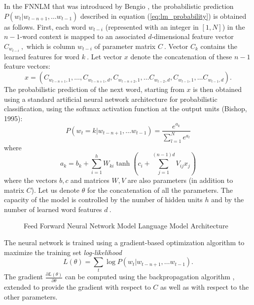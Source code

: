In the \ac{FNNLM} that was introduced by Bengio
\cite{Bengio:2003:NPL:944919.944966},  the probabilistic prediction $P(w_t | w_{t-n+1}, \ldots w_{t-1})$ described
in equation (\ref{eq:lm_probability}) is obtained as follows. First, each word $w_{t-i}$ (represented
with an integer in $[1,N]$) in the  $n-1$-word context is mapped
to an associated $d$-dimensional feature vector $C_{w_{t-i}}\ ,$ which is
column $w_{t-i}$ of parameter matrix $C\ .$ Vector $C_k$
contains the learned features for word $k\ .$
Let vector $x$ denote the concatenation of these $n-1$
feature vectors:
\begin{equation}
  x = (C_{w_{t-n+1},1}, \ldots, C_{w_{t-n+1},d}, C_{w_{t-n+2},1}, \ldots C_{w_{t-2},d}, C_{w_{t-1},1}, \ldots C_{w_{t-1},d}).
\end{equation}
The probabilistic prediction of the next word, starting from $x$
is then obtained using a standard artificial neural network architecture
for probabilistic classification, using the softmax activation function at the output units (Bishop, 1995):
\begin{equation}
 P(w_t=k | w_{t-n+1}, \ldots w_{t-1}) = \frac{e^{a_k}}{\sum_{l=1}^N e^{a_l}}
\end{equation}
where
\begin{equation}
 a_k = b_k + \sum_{i=1}^h W_{ki} \tanh(c_i + \sum_{j=1}^{(n-1)d} V_{ij} x_j)
\end{equation}
where the vectors $b,c$ and matrices $W,V$ are also
parameters (in addition to matrix $C$). Let us denote
$\theta$ for the concatenation of all the parameters.
The capacity of the model is controlled by the number of hidden units $h$
and by the number of learned word features $d\ .$ 


\begin{figure}[h]
    \centering
    \caption{Feed Forward Neural Network Model Language Model Architecture}
    \label{fig:NNLM_architecture}
\end{figure}

The neural network is trained using a gradient-based optimization algorithm
to maximize the training set \textit{log-likelihood}
\begin{equation}
 L(\theta) = \sum_t \log P(w_t | w_{t-n+1}, \ldots w_{t-1}) .
\end{equation}
The gradient $\frac{\partial L(\theta)}{\partial \theta}$
can be computed using the backpropagation algorithm \cite{Bishop:1995:NNP:525960}, extended
to provide the gradient with respect to $C$ as well as with
respect to the other parameters. 



